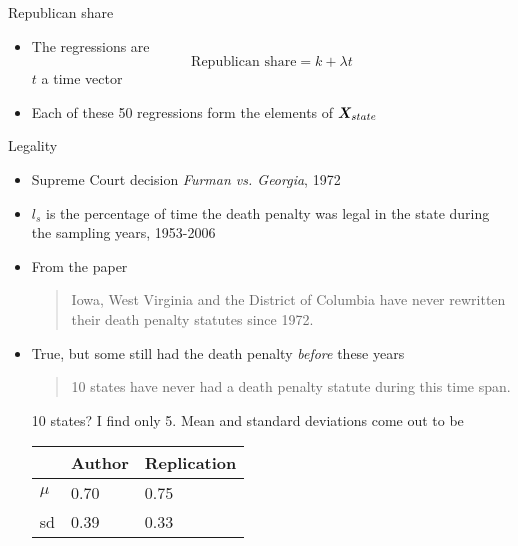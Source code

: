 \documentclass{beamer}
\begin{document}
	\begin{frame}{Republican share}
		\begin{itemize}
						\item The regressions are \[ \text{Republican share} = k + \lambda t \] $ t $ a time vector 
						\item Each of these 50 regressions form the elements of $ \bm{X_}{state }$
		\end{itemize}
	\end{frame}
	
	\begin{frame}{Legality}
		\begin{itemize}
			\item Supreme Court decision \textit{Furman vs. Georgia}, 1972
			\item $ l_s $ is the percentage of time the death penalty was legal in the state during the sampling years, 1953-2006
			\item From the paper \begin{quotation}
				Iowa, West Virginia and the District of Columbia have never rewritten their death penalty statutes since 1972.
			\end{quotation}
			\item True, but some still had the death penalty \textit{before} these years
			\begin{quotation}
				10 states have never had a death penalty statute during this time span.
			\end{quotation}
			10 states? I find only 5. Mean and standard deviations come out to be 
			\begin{table}
				\begin{tabular}{lll}
					& Author & Replication \\
					\hline 
					\hline 
					$ \mu $& 0.70 & 0.75 \\
					sd & 0.39 & 0.33 \\
					\hline 
				\end{tabular}
			\end{table}
			
		\end{itemize}
	\end{frame}
	
\end{document}
